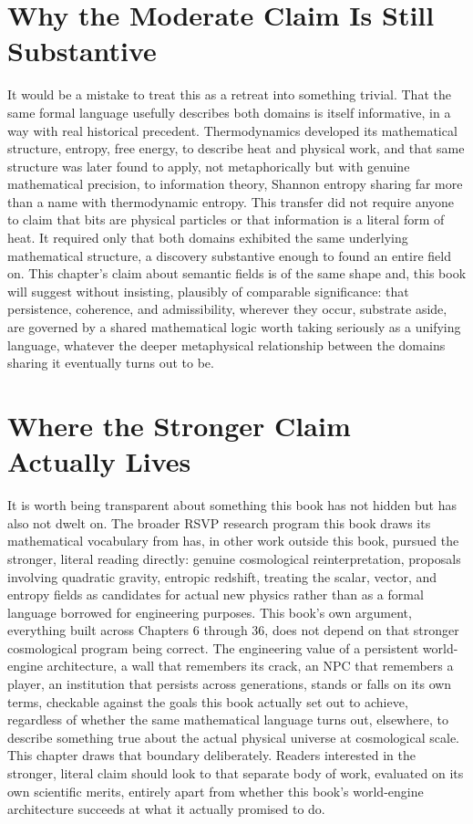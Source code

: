 \section{Why the Moderate Claim Is Still Substantive}

It would be a mistake to treat this as a retreat into something trivial. That the same formal language usefully describes both domains is itself informative, in a way with real historical precedent. Thermodynamics developed its mathematical structure, entropy, free energy, to describe heat and physical work, and that same structure was later found to apply, not metaphorically but with genuine mathematical precision, to information theory, Shannon entropy sharing far more than a name with thermodynamic entropy. This transfer did not require anyone to claim that bits are physical particles or that information is a literal form of heat. It required only that both domains exhibited the same underlying mathematical structure, a discovery substantive enough to found an entire field on. This chapter's claim about semantic fields is of the same shape and, this book will suggest without insisting, plausibly of comparable significance: that persistence, coherence, and admissibility, wherever they occur, substrate aside, are governed by a shared mathematical logic worth taking seriously as a unifying language, whatever the deeper metaphysical relationship between the domains sharing it eventually turns out to be.

\section{Where the Stronger Claim Actually Lives}

It is worth being transparent about something this book has not hidden but has also not dwelt on. The broader RSVP research program this book draws its mathematical vocabulary from has, in other work outside this book, pursued the stronger, literal reading directly: genuine cosmological reinterpretation, proposals involving quadratic gravity, entropic redshift, treating the scalar, vector, and entropy fields as candidates for actual new physics rather than as a formal language borrowed for engineering purposes. This book's own argument, everything built across Chapters 6 through 36, does not depend on that stronger cosmological program being correct. The engineering value of a persistent world-engine architecture, a wall that remembers its crack, an NPC that remembers a player, an institution that persists across generations, stands or falls on its own terms, checkable against the goals this book actually set out to achieve, regardless of whether the same mathematical language turns out, elsewhere, to describe something true about the actual physical universe at cosmological scale. This chapter draws that boundary deliberately. Readers interested in the stronger, literal claim should look to that separate body of work, evaluated on its own scientific merits, entirely apart from whether this book's world-engine architecture succeeds at what it actually promised to do.

